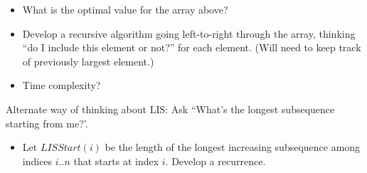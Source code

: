 \documentclass[12pt]{article}
\begin{document}
\begin{itemize}
  \item What is the optimal value for the array above? 
  \vspace*{.75in}
  \item Develop a recursive algorithm going left-to-right through the array, thinking ``do I include this element or not?'' for each element. (Will need to keep track of previously largest element.)
  \vspace{3in}
  \item Time complexity?
\end{itemize}

\clearpage
Alternate way of thinking about \textsc{LIS}: Ask ``What's the longest subsequence starting from me?'. 
\begin{itemize}
  \item Let $LISStart(i)$ be the length of the longest increasing subsequence
  among indices $i .. n$ that starts at index $i$. Develop a recurrence.
\end{itemize}
\end{document}
